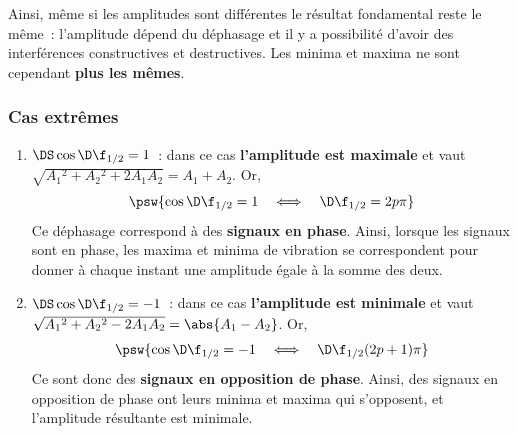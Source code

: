 \documentclass[../../main/main.tex]{subfiles}
\begin{document}
Ainsi, même si les amplitudes sont différentes le résultat fondamental reste le
même~: l'amplitude dépend du déphasage et il y a possibilité d'avoir des
interférences constructives et destructives. Les minima et maxima ne sont
cependant \textbf{plus les mêmes}.

\subsubsection{Cas extrêmes}

\begin{enumerate}[label=$\triangleright$]
	\item $\DS \cos \D\f_{1/2} = 1$~: dans ce cas
	      \textbf{l'amplitude est maximale} et vaut
	      $\sqrt{A_1{}^2+A_2{}^2+2A_1A_2} = A_1+A_2$. Or,
	      \[\psw{
			      \cos \D\f_{1/2} = 1
			      \quad\Longleftrightarrow\quad
			      \D\f_{1/2} = 2p\pi
		      }\]
	      Ce déphasage correspond à des \textbf{signaux en phase}. Ainsi, lorsque
	      les signaux sont en phase, les maxima et minima de vibration se
	      correspondent pour donner à chaque instant une amplitude égale à la
	      somme des deux.
	\item $\DS \cos \D\f_{1/2} = -1$~: dans ce cas \textbf{l'amplitude est minimale}
	      et vaut $\sqrt{A_1{}^2+A_2{}^2-2A_1A_2} = \abs{A_1-A_2}$. Or,
	      \[\psw{
			      \cos \D\f_{1/2} = -1
			      \quad\Longleftrightarrow\quad
			      \D\f_{1/2} (2p+1)\pi
		      }\]
	      Ce sont donc des \textbf{signaux en opposition de phase}. Ainsi, des
	      signaux en opposition de phase ont leurs minima et maxima qui
	      s'opposent, et l'amplitude résultante est minimale.
\end{enumerate}
\end{document}
